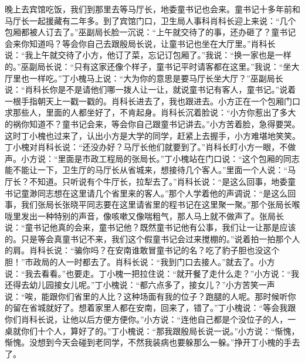 \documentclass[12pt,oneside]{book}
\begin{document}
晚上去宾馆吃饭，我们到那里去等马厅长，地委童书记也会来。童书记十多年前和马厅长一起援藏有二年多。到了宾馆门口，卫生局人事科肖科长迎上来说：``几个包厢都被人订去了。''巫副局长脸一沉说：``上午就交待了的事，还办砸了？童书记会来你知道吗？等会你自己去跟殷局长说，让童书记也坐在大厅里。''肖科长说：``我上午就交待了小方，他订了菜，忘记订包厢了。''我说：``换一家也是一样的。''巫副局长说：``只有这家还像个样子，童书记平时请客都在这里。''我说：``坐大厅里也一样吃。''丁小槐马上说：``大为你的意思是要马厅长坐大厅？''巫副局长说：``肖科长你是不是请他们哪一拨人让一让，就说童书记有客人，童书记。''说着一根手指朝天上一戳一戳的。肖科长进去了，我也跟进去。小方正在一个包厢门口求那些人，里面的人都坐好了，不肯起身。肖科长沉着脸说：``小方你惹出了多大的祸你知道不？童书记会来，等会你自己跟童书记讲去。''小方苦着脸，急得要哭。这时丁小槐也过来了，认出小方是大学的同学，赶紧上去握手，小方难堪地笑笑。丁小槐对肖科长说：``还没办好？马厅长他们就要到了。''肖科长盯小方一眼，不做声。小方说：``里面是市政工程局的张局长。''丁小槐站在门口说：``这个包厢的同志能不能让一下，卫生厅的马厅长从省城来，想接待几个客人。''里面一个人说：``马厅长？不知道。只听说有个牛厅长，拉犁去了。''肖科长说：``是这么回事，地委童书记童渺同志想在这里请几个省里来的客人。''那个人学着他的声调说：``是这么回事，我们张局长张晓平同志要在这里请省里的程书记在这里聚一聚。''那个张局长喉咙里发出一种特别的声音，像咳嗽又像喘粗气，那人马上就不做声了。张局长说：``童书记他真的会来，童书记他？既然童书记他有公事，我们让一让那是应该的。只是等会真童书记不来，我们这个假童书记会过来搅棚的。''说着拍一拍那个人的肩。肖科长说：``骗你吗？在安南谁敢冒童书记的名？吃了豹子胆也没这个胆！''市政局的人一时都去了。肖科长说：``我到门口去接人。''就去了。小方说：``我去看看。''也要走。丁小槐一把拉住说：``就开餐了走什么走？''小方说：``我还得去幼儿园接女儿呢。''丁小槐说：``都六点多了，接女儿？''小方苦笑一声说：``唉，能跟你们省里的人比？这种场面有我的位子？跑腿的人呢。那时候听你的留在省城就好了。想着家里人都在安南，回来了，错了。''丁小槐说：``等会我跟你们肖科长说，让他以后方便方便你。''小方说：``连他自己都是个没位子的人，一桌就你们十个人，算好了的。''丁小槐说：``那我跟殷局长说一说。''小方说：``惭愧，惭愧。没想到今天会碰到老同学，不然我装病也要躲那么一躲。''挣开丁小槐的手去了。
\end{document}
